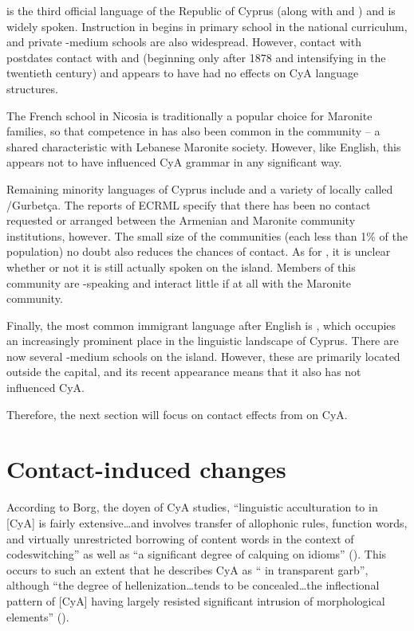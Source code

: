 \documentclass[output=paper]{langsci/langscibook}
\begin{document}
 is the third official language of the Republic of {Cyprus} (along with  and ) and is widely spoken. Instruction in  begins in primary school in the national curriculum, and private -medium schools are also widespread. However, contact with  postdates contact with  and  (beginning only after 1878 and intensifying in the twentieth century) and appears to have had no effects on CyA language structures.

The French school in Nicosia is traditionally a popular choice for Maronite families, so that competence in  has also been common in the community – a shared characteristic with Lebanese Maronite society. However, like English, this appears not to have influenced CyA grammar in any significant way.

Remaining minority languages of {Cyprus} include  and a variety of  locally called /Gurbetça. The reports of ECRML specify that there has been no contact requested or arranged between the Armenian and Maronite community institutions, however. The small size of the communities (each less than 1\% of the population) no doubt also reduces the chances of contact. As for , it is unclear whether or not it is still actually spoken on the island. Members of this community are -speaking and interact little if at all with the Maronite community.

Finally, the most common immigrant language after English is , which occupies an increasingly prominent place in the linguistic landscape of {Cyprus}. There are now several -medium schools on the island. However, these are primarily located outside the capital, and its recent appearance means that it also has not influenced CyA.


Therefore, the next section will focus on contact effects from  on CyA.

\section{Contact-induced changes}
According to Borg, the doyen of CyA studies, “linguistic acculturation to  in [CyA] is fairly extensive…and involves {transfer} of allophonic rules, function words, and virtually unrestricted borrowing of content words in the context of {codeswitching}” as well as “a significant degree of {calquing} on  {idioms}” (\citeyear[64]{Borg2004}). This occurs to such an extent that he describes CyA as “ in transparent  garb”, although “the degree of hellenization…tends to be concealed…the {inflectional} pattern of [CyA] having largely resisted significant intrusion of  morphological elements” (\citeyear[65]{Borg2004}).
\end{document}
